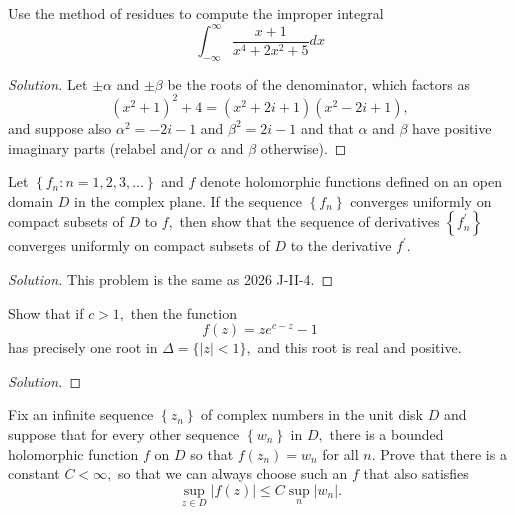 \documentclass[10pt]{article}
\newenvironment{soln}{\begin{proof}[Solution]}{\end{proof}}
\begin{document}
\begin{problem}
[2018 J-I-2]
Use the method of residues to compute the improper integral
$$
\int_{-\infty}^{\infty} \frac{x+1}{x^4+2 x^2+5} d x
$$
\end{problem}

\begin{soln}
    Let $\pm\alpha$ and $\pm\beta$ be the roots of the denominator,
    which factors as
    \begin{equation*}
	(x^2 + 1)^2 + 4 = (x^2 + 2i + 1)(x^2 - 2i + 1),
    \end{equation*}
    and suppose also $\alpha^2 = -2i-1$ and $\beta^2 = 2i-1$
    and that $\alpha$ and $\beta$ have positive imaginary parts
    (relabel and/or $\alpha$ and $\beta$ otherwise).
\end{soln}



\begin{problem}
[2018 J-II-4]
Let $\left\{f_n: n=1,2,3, \ldots\right\}$ and $f$ denote holomorphic functions defined on an open domain $D$ in the complex plane. If the sequence $\left\{f_n\right\}$ converges uniformly on compact subsets of $D$ to $f,$ then show that the sequence of derivatives $\left\{f_n^{\prime}\right\}$ converges uniformly on compact subsets of $D$ to the derivative $f^{\prime}.$
\end{problem}

\begin{soln}
    This problem is the same as 2026 J-II-4.
\end{soln}



\begin{problem}
[2018 A-I-3]
Show that if $c>1,$ then the function
$$
f(z)=z e^{c-z}-1
$$
has precisely one root in $\Delta=\{|z|<1\},$ and this root is real and positive.
\end{problem}

\begin{soln}
    
\end{soln}



\begin{problem}
[2018 A-II-4]
Fix an infinite sequence $\left\{z_n\right\}$ of complex numbers in the unit disk $D$ and suppose that for every other sequence $\left\{w_n\right\}$ in $D,$ there is a bounded holomorphic function $f$ on $D$ so that $f\left(z_n\right)=w_n$ for all $n.$ Prove that there is a constant $C<\infty,$ so that we can always choose such an $f$ that also satisfies
$$
\sup _{z \in D}|f(z)| \leq C \sup _n\left|w_n\right| .
$$
\end{problem}
\end{document}
